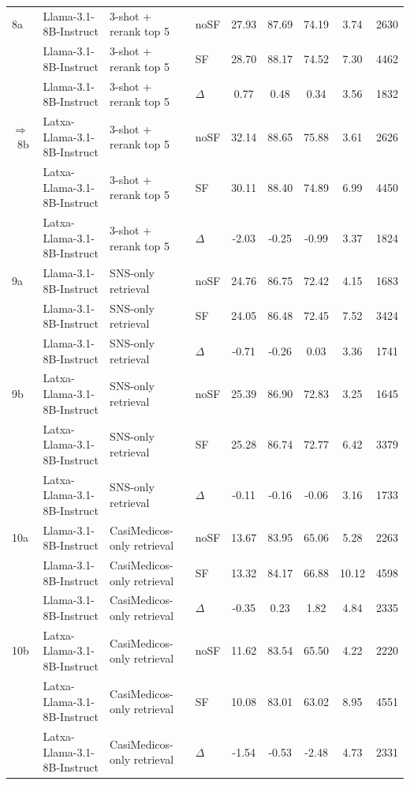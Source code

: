 \begin{scriptsize}
\begin{longtable}{l l l l c c c c c}
\dmidrule
8a & Llama-3.1-8B-Instruct & 3-shot + rerank top 5 & noSF & 27.93 & 87.69 & 74.19 & 3.74 & 2630 \\
 & Llama-3.1-8B-Instruct & 3-shot + rerank top 5 & SF & 28.70 & 88.17 & 74.52 & 7.30 & 4462 \\
 & Llama-3.1-8B-Instruct & 3-shot + rerank top 5 & $\Delta$ & 0.77 & 0.48 & 0.34 & 3.56 & 1832 \\
\rowcolor{tabhighlight}$\Rightarrow$~8b & Latxa-Llama-3.1-8B-Instruct & 3-shot + rerank top 5 & noSF & 32.14 & 88.65 & 75.88 & 3.61 & 2626 \\
 & Latxa-Llama-3.1-8B-Instruct & 3-shot + rerank top 5 & SF & 30.11 & 88.40 & 74.89 & 6.99 & 4450 \\
 & Latxa-Llama-3.1-8B-Instruct & 3-shot + rerank top 5 & $\Delta$ & -2.03 & -0.25 & -0.99 & 3.37 & 1824 \\
\dmidrule
9a & Llama-3.1-8B-Instruct & SNS-only retrieval & noSF & 24.76 & 86.75 & 72.42 & 4.15 & 1683 \\
 & Llama-3.1-8B-Instruct & SNS-only retrieval & SF & 24.05 & 86.48 & 72.45 & 7.52 & 3424 \\
 & Llama-3.1-8B-Instruct & SNS-only retrieval & $\Delta$ & -0.71 & -0.26 & 0.03 & 3.36 & 1741 \\
9b & Latxa-Llama-3.1-8B-Instruct & SNS-only retrieval & noSF & 25.39 & 86.90 & 72.83 & 3.25 & 1645 \\
 & Latxa-Llama-3.1-8B-Instruct & SNS-only retrieval & SF & 25.28 & 86.74 & 72.77 & 6.42 & 3379 \\
 & Latxa-Llama-3.1-8B-Instruct & SNS-only retrieval & $\Delta$ & -0.11 & -0.16 & -0.06 & 3.16 & 1733 \\
\dmidrule
10a & Llama-3.1-8B-Instruct & CasiMedicos-only retrieval & noSF & 13.67 & 83.95 & 65.06 & 5.28 & 2263 \\
 & Llama-3.1-8B-Instruct & CasiMedicos-only retrieval & SF & 13.32 & 84.17 & 66.88 & 10.12 & 4598 \\
 & Llama-3.1-8B-Instruct & CasiMedicos-only retrieval & $\Delta$ & -0.35 & 0.23 & 1.82 & 4.84 & 2335 \\
10b & Latxa-Llama-3.1-8B-Instruct & CasiMedicos-only retrieval & noSF & 11.62 & 83.54 & 65.50 & 4.22 & 2220 \\
 & Latxa-Llama-3.1-8B-Instruct & CasiMedicos-only retrieval & SF & 10.08 & 83.01 & 63.02 & 8.95 & 4551 \\
 & Latxa-Llama-3.1-8B-Instruct & CasiMedicos-only retrieval & $\Delta$ & -1.54 & -0.53 & -2.48 & 4.73 & 2331 \\
\end{longtable}
\end{scriptsize}
